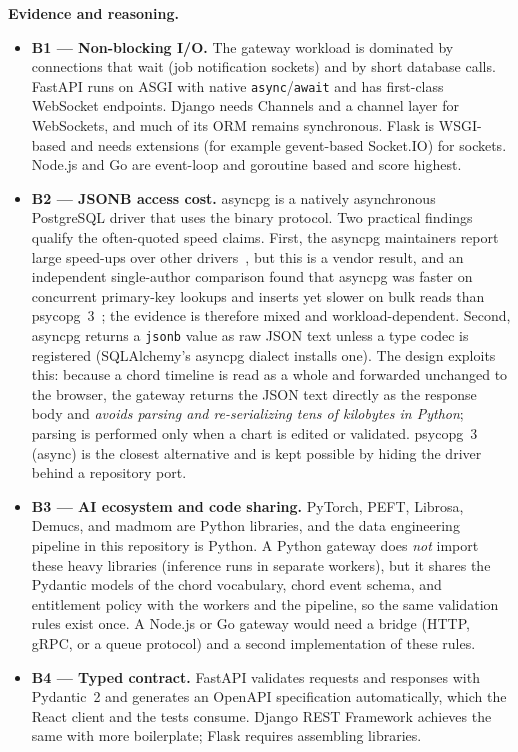 \documentclass[a4paper]{article}
\begin{document}
\textbf{Evidence and reasoning.}
\begin{itemize}
    \item \textbf{B1 --- Non-blocking I/O.} The gateway workload is dominated by connections that wait (job notification sockets) and by short database calls. FastAPI runs on ASGI with native \texttt{async}/\texttt{await} and has first-class WebSocket endpoints. Django needs Channels and a channel layer for WebSockets, and much of its ORM remains synchronous. Flask is WSGI-based and needs extensions (for example gevent-based Socket.IO) for sockets. Node.js and Go are event-loop and goroutine based and score highest.
    \item \textbf{B2 --- JSONB access cost.} asyncpg is a natively asynchronous PostgreSQL driver that uses the binary protocol. Two practical findings qualify the often-quoted speed claims. First, the asyncpg maintainers report large speed-ups over other drivers~\cite{asyncpg_readme}, but this is a vendor result, and an independent single-author comparison found that asyncpg was faster on concurrent primary-key lookups and inserts yet slower on bulk reads than psycopg~3~\cite{asyncpg_psycopg_blog}; the evidence is therefore mixed and workload-dependent. Second, asyncpg returns a \texttt{jsonb} value as raw JSON text unless a type codec is registered (SQLAlchemy's asyncpg dialect installs one). The design exploits this: because a chord timeline is read as a whole and forwarded unchanged to the browser, the gateway returns the JSON text directly as the response body and \emph{avoids parsing and re-serializing tens of kilobytes in Python}; parsing is performed only when a chart is edited or validated. psycopg~3 (async) is the closest alternative and is kept possible by hiding the driver behind a repository port.
    \item \textbf{B3 --- AI ecosystem and code sharing.} PyTorch, PEFT, Librosa, Demucs, and madmom are Python libraries, and the data engineering pipeline in this repository is Python. A Python gateway does \emph{not} import these heavy libraries (inference runs in separate workers), but it shares the Pydantic models of the chord vocabulary, chord event schema, and entitlement policy with the workers and the pipeline, so the same validation rules exist once. A Node.js or Go gateway would need a bridge (HTTP, gRPC, or a queue protocol) and a second implementation of these rules.
    \item \textbf{B4 --- Typed contract.} FastAPI validates requests and responses with Pydantic~2 and generates an OpenAPI specification automatically, which the React client and the tests consume. Django REST Framework achieves the same with more boilerplate; Flask requires assembling libraries.

\end{itemize}
\end{document}
